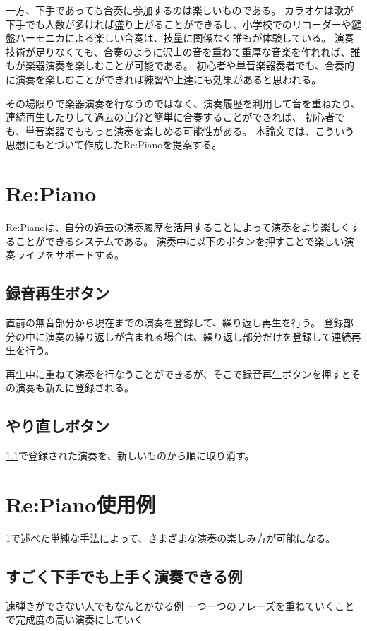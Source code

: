 \documentclass[submit,techreq]{ec2017}
\begin{document}
一方、下手であっても合奏に参加するのは楽しいものである。
カラオケは歌が下手でも人数が多ければ盛り上がることができるし、小学校でのリコーダーや鍵盤ハーモニカによる楽しい合奏は、技量に関係なく誰もが体験している。
演奏技術が足りなくても、合奏のように沢山の音を重ねて重厚な音楽を作れれば、誰もが楽器演奏を楽しむことが可能である。
初心者や単音楽器奏者でも、合奏的に演奏を楽しむことができれば練習や上達にも効果があると思われる。

その場限りで楽器演奏を行なうのではなく、演奏履歴を利用して音を重ねたり、連続再生したりして過去の自分と簡単に合奏することができれば、
初心者でも、単音楽器でももっと演奏を楽しめる可能性がある。
本論文では、こういう思想にもとづいて作成したRe:Pianoを提案する。

\section{Re:Piano}
\label{repiano}

Re:Pianoは、自分の過去の演奏履歴を活用することによって演奏をより楽しくすることができるシステムである。
演奏中に以下のボタンを押すことで楽しい演奏ライフをサポートする。

\subsection{録音再生ボタン}
\label{recplaybutton}
直前の無音部分から現在までの演奏を登録して、繰り返し再生を行う。
登録部分の中に演奏の繰り返しが含まれる場合は、繰り返し部分だけを登録して連続再生を行う。

再生中に重ねて演奏を行なうことができるが、そこで録音再生ボタンを押すとその演奏も新たに登録される。

\subsection{やり直しボタン}
\ref{recplaybutton}で登録された演奏を、新しいものから順に取り消す。

\section{Re:Piano使用例}

\ref{repiano}で述べた単純な手法によって、さまざまな演奏の楽しみ方が可能になる。

\subsection{すごく下手でも上手く演奏できる例}
速弾きができない人でもなんとかなる例
一つ一つのフレーズを重ねていくことで完成度の高い演奏にしていく
\end{document}
